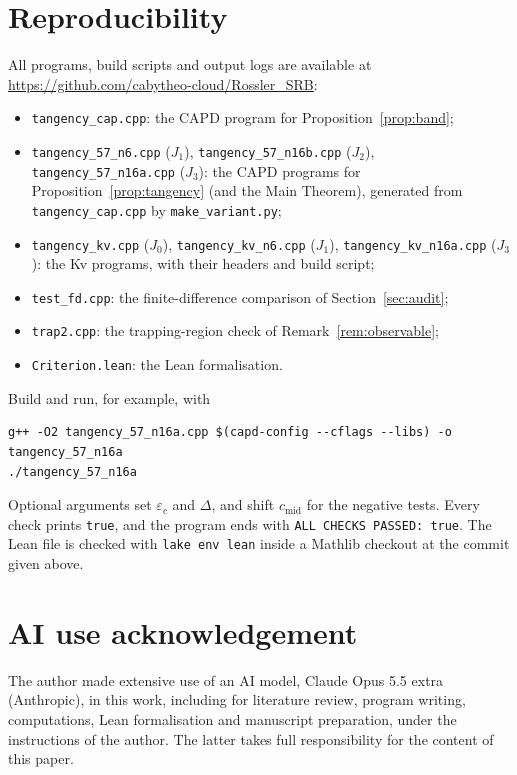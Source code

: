 \documentclass[11pt]{amsart}
\theoremstyle{definition}
\theoremstyle{remark}
\newcommand{\cmid}{c_{\mathrm{mid}}}
\begin{document}
\appendix
\section{Reproducibility}
All programs, build scripts and output logs are available at \url{https://github.com/cabytheo-cloud/Rossler_SRB}:
\begin{itemize}[leftmargin=*]
\item \texttt{tangency\_cap.cpp}: the CAPD program for Proposition~\ref{prop:band};
\item \texttt{tangency\_57\_n6.cpp} ($J_1$), \texttt{tangency\_57\_n16b.cpp} ($J_2$),
\texttt{tangency\_57\_n16a.cpp} ($J_3$): the CAPD programs for Proposition~\ref{prop:tangency}
(and the Main Theorem), generated from \texttt{tangency\_cap.cpp} by \texttt{make\_variant.py};
\item \texttt{tangency\_kv.cpp} ($J_0$), \texttt{tangency\_kv\_n6.cpp} ($J_1$),
\texttt{tangency\_kv\_n16a.cpp} ($J_3$): the Kv programs, with their headers and build script;
\item \texttt{test\_fd.cpp}: the finite-difference comparison of Section~\ref{sec:audit};
\item \texttt{trap2.cpp}: the trapping-region check of Remark~\ref{rem:observable};
\item \texttt{Criterion.lean}: the Lean formalisation.
\end{itemize}
Build and run, for example, with
\begin{verbatim}
g++ -O2 tangency_57_n16a.cpp $(capd-config --cflags --libs) -o tangency_57_n16a
./tangency_57_n16a
\end{verbatim}
Optional arguments set $\varepsilon_c$ and $\Delta$, and shift $\cmid$ for the negative tests. Every check prints
\texttt{true}, and the program ends with \texttt{ALL CHECKS PASSED: true}. The Lean file is checked with
\texttt{lake env lean} inside a Mathlib checkout at the commit given above.

\section*{AI use acknowledgement}
The author made extensive use of an AI model, Claude Opus 5.5 extra (Anthropic), in this work, including for
literature review, program writing, computations, Lean formalisation and manuscript preparation, under the
instructions of the author. The latter takes full responsibility for the content of this paper.
\end{document}
